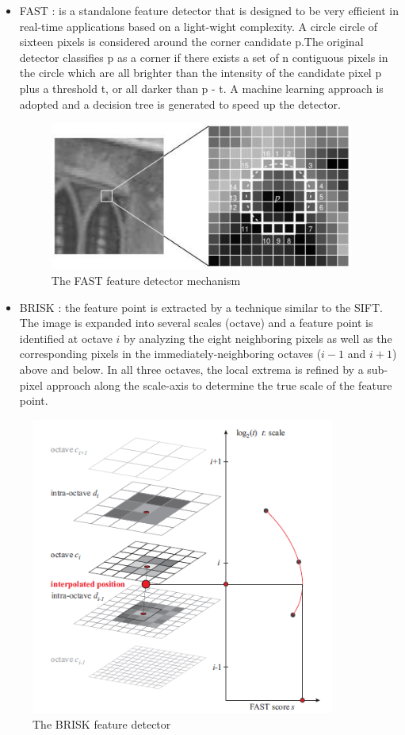 \begin{itemize}
\item FAST \cite{rosten2010faster}: is a standalone feature detector that is designed to be very efficient in real-time applications based on a light-wight complexity. A circle circle of sixteen pixels is considered around the corner candidate p.The original detector classifies p as a corner if there exists a set of n contiguous pixels in the circle which are all brighter than the intensity of the candidate pixel p plus a threshold t, or all darker than p - t. A machine learning approach is adopted and a decision tree is generated to speed up the detector. 

\begin{figure}[H]
  \centering
  \includegraphics[width=100mm]{figures/fast_detector}
  \caption{The FAST feature detector mechanism}\label{fig:fast_detector}
\end{figure}

\item BRISK \cite{leutenegger2011brisk}: the feature point is extracted by a technique similar to the SIFT. The image is expanded into several scales (octave) and a feature point is identified at octave $i$ by analyzing the eight neighboring pixels as well as the corresponding pixels in the immediately-neighboring octaves ($i-1$ and $i+1$) above and below. In all three octaves, the local extrema is refined by a sub-pixel approach along the scale-axis to determine the true scale of the feature point.
\end{itemize}
\begin{figure}[H]
  \centering
  \includegraphics[width=100mm]{figures/brisk_detector}
  \caption{The BRISK feature detector}\label{fig:brisk_detector}
\end{figure}

